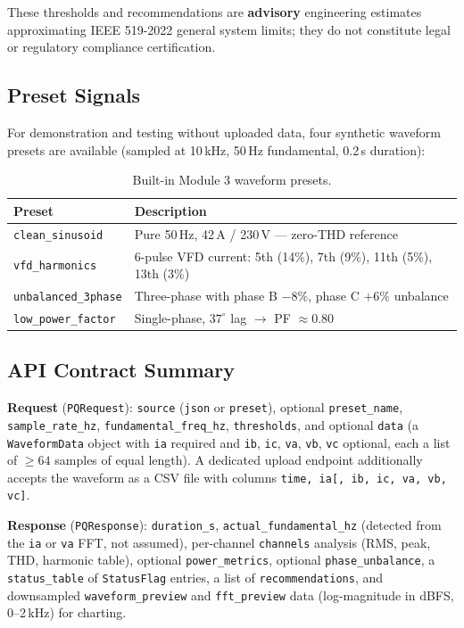 \documentclass[11pt,a4paper]{article}
\newcommand{\code}[1]{\texttt{#1}}
\begin{document}
These thresholds and recommendations are \textbf{advisory} engineering
estimates approximating IEEE 519-2022 general system limits; they do not
constitute legal or regulatory compliance certification.

\subsection{Preset Signals}

For demonstration and testing without uploaded data, four synthetic
waveform presets are available (sampled at 10\,kHz, 50\,Hz fundamental,
0.2\,s duration):

\begin{table}[h]
\centering
\begin{tabular}{@{}ll@{}}
\toprule
\textbf{Preset} & \textbf{Description} \\
\midrule
\code{clean\_sinusoid}     & Pure 50\,Hz, 42\,A / 230\,V --- zero-THD reference \\
\code{vfd\_harmonics}      & 6-pulse VFD current: 5th (14\%), 7th (9\%), 11th (5\%), 13th (3\%) \\
\code{unbalanced\_3phase}  & Three-phase with phase B $-8\%$, phase C $+6\%$ unbalance \\
\code{low\_power\_factor}  & Single-phase, $37^\circ$ lag $\rightarrow$ PF $\approx 0.80$ \\
\bottomrule
\end{tabular}
\caption{Built-in Module 3 waveform presets.}
\end{table}

\subsection{API Contract Summary}

\textbf{Request} (\code{PQRequest}): \code{source} (\code{json} or
\code{preset}), optional \code{preset\_name}, \code{sample\_rate\_hz},
\code{fundamental\_freq\_hz}, \code{thresholds}, and optional \code{data}
(a \code{WaveformData} object with \code{ia} required and \code{ib}, \code{ic},
\code{va}, \code{vb}, \code{vc} optional, each a list of $\geq 64$ samples of
equal length). A dedicated upload endpoint additionally accepts the waveform
as a CSV file with columns \code{time, ia[, ib, ic, va, vb, vc]}.

\textbf{Response} (\code{PQResponse}): \code{duration\_s},
\code{actual\_fundamental\_hz} (detected from the \code{ia} or \code{va}
FFT, not assumed), per-channel \code{channels} analysis (RMS, peak, THD,
harmonic table), optional \code{power\_metrics}, optional
\code{phase\_unbalance}, a \code{status\_table} of \code{StatusFlag} entries,
a list of \code{recommendations}, and downsampled \code{waveform\_preview}
and \code{fft\_preview} data (log-magnitude in dBFS, 0--2\,kHz) for
charting.
\end{document}
